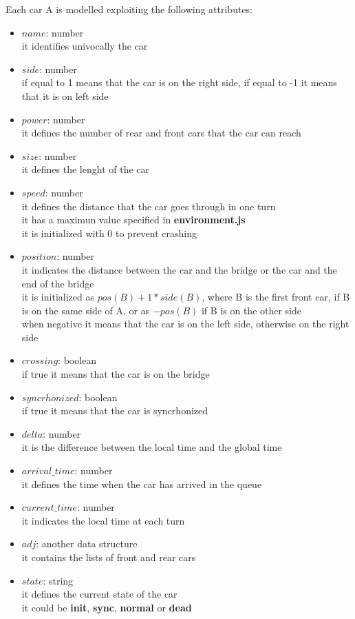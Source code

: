 Each car A is modelled exploiting the following attributes:
\begin{itemize}
    \item $name$: number\\ it identifies univocally the car
    \item $side$: number\\ if equal to 1 means that the car is on the right side, 
    if equal to -1 it means that it is on left side
    \item $power$: number\\ it defines the number of rear and front cars that the car can reach
    \item $size$: number \\ it defines the lenght of the car
    \item $speed$: number\\ it defines the distance that the car goes through in one turn\\
    it has a maximun value specified in \textbf{environment.js}\\
    it is initialized with 0 to prevent crashing 
    \item $position$: number \\it indicates the distance between the car and the bridge or the car and the end of the
    bridge\\it is initialized as $pos(B)+1*side(B)$, where B is the first front car, if B is on the same side of A, or
    as $-pos(B)$ if B is on the other side\\ when negative it means that the car is on the left side, otherwise on the right side
    \item $crossing$: boolean\\ if true it means that the car is on the bridge
    \item $syncrhonized$: boolean\\ if true it means that the car is syncrhonized    
    \item $delta$: number\\ it is the difference between the local time and the global time
    \item $arrival\_time$: number\\ it defines the time when the car has arrived in the queue
    \item $current\_time$: number\\ it indicates the local time at each turn
    \item $adj$: another data structure\\ it contains the lists of front and rear cars
    \item $state$: string\\ it defines the current state of the car\\ it could be \textbf{init}, \textbf{sync}, \textbf{normal} or \textbf{dead}
\end{itemize}
